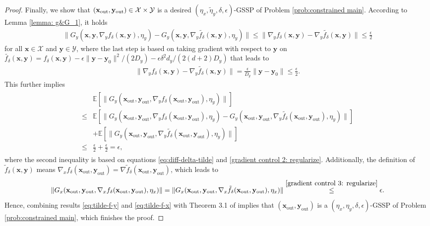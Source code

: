 \documentclass[11pt]{article}
\def\vx{\mathbf{x}}
\def\vy{\mathbf{y}}
\def\fX{{\mathcal{X}}}
\def\fY{{\mathcal{Y}}}
\def\BE{{\mathbb{E}}}
\begin{document}
\begin{proof}
Finally, we show that $(\vx_{\rm out}, \vy_{\rm out})\in\fX\times\fY$ is a desired $(\eta_x,\tilde\eta_y,\delta,\epsilon)$-GSSP of Problem \eqref{prob:constrained main}.
According to Lemma \ref{lemma: g&G_1}, it holds
\begin{align}\label{eq:diff-delta-tilde}
\!\!\! \|G_y(\vx,\vy, \nabla_y f_\delta(\vx,\vy), \eta_y) - G_y(\vx,\vy, \nabla_y \tilde{f_\delta}(\vx,\vy), \eta_y) \|  
\leq  \|\nabla_y f_\delta(\vx,\vy)-\nabla_y \tilde{f_\delta}(\vx,\vy)\|
\leq \frac{\epsilon}{2}
\end{align}
for all $\vx\in\fX$ and $\vy\in\fY$,
where the last step is based on taking gradient with respect to $\vy$ on 
$\tilde{f_\delta}(\vx,\vy)=f_\delta(\vx,\vy)-\epsilon\|\vy-\vy_0\|^2/({2D_y})-{\epsilon\delta^2 d_y}/({2(d+2)D_y})$ that leads to
\begin{align*}
    \|\nabla_y f_\delta(\vx,\vy)-\nabla_y \tilde{f_\delta}(\vx,\vy)\|
= \frac{\epsilon}{D_y}\|\vy-\vy_0\|    
\leq\frac{\epsilon}{2}.
\end{align*}
This further implies
\begin{align}\label{eq:tilde-f-y}
\begin{split}    
&\BE\left[\|G_y(\vx_{\mathrm{out}}, \vy_{\mathrm{out}}, \nabla_y f_\delta(\vx_{\mathrm{out}},\vy_{\mathrm{out}}), \eta_y)\|\right]\\
\le & \BE\left[\| G_y(\vx_{\mathrm{out}},\vy_{\mathrm{out}}, \nabla_y f_\delta(\vx_{\mathrm{out}},\vy_{\mathrm{out}}), \eta_y) - G_y(\vx_{\mathrm{out}},\vy_{\mathrm{out}}, \nabla_y \tilde{f_\delta}(\vx_{\mathrm{out}},\vy_{\mathrm{out}}), \eta_y) \|\right] \\
& + \BE\left[\|G_y(\vx_{\mathrm{out}},\vy_{\mathrm{out}}, \nabla_y \tilde{f_\delta}(\vx_{\mathrm{out}},\vy_{\mathrm{out}}), \eta_y) \|\right] \\
\le & \frac{\epsilon}{2} + \frac{\epsilon}{2} = \epsilon,
\end{split}
\end{align}
where the second inequality is based on equations \eqref{eq:diff-delta-tilde} and \eqref{gradient control 2: regularize}.
Additionally, the definition of $\tilde f_\delta(\vx,\vy)$ means $\nabla_x f_\delta(\vx_{\mathrm{out}},\vy_{\mathrm{out}})=\nabla \tilde f_\delta(\vx_{\mathrm{out}},\vy_{\mathrm{out}})$, which leads to
\begin{align}\label{eq:tilde-f-x}
\|G_x(\vx_{\mathrm{out}},\vy_{\mathrm{out}}, \nabla_x f_\delta(\vx_{\mathrm{out}},\vy_{\mathrm{out}}), \eta_x)\| = \|G_x(\vx_{\mathrm{out}},\vy_{\mathrm{out}}, \nabla_x \tilde{f_\delta}(\vx_{\mathrm{out}},\vy_{\mathrm{out}}), \eta_x)\| \overset{\eqref{gradient control 3: regularize}}\le \epsilon.    
\end{align}
Hence, combining results \eqref{eq:tilde-f-y} and \eqref{eq:tilde-f-x} 
with Theorem 3.1 of \citet{lin2022gradient} implies that
$(\vx_{\mathrm{out}},\vy_{\mathrm{out}})$ is a $(\eta_x,\eta_y,\delta,\epsilon)$-GSSP of Problem \eqref{prob:constrained main}, which finishes the proof.
\end{proof}
\end{document}
